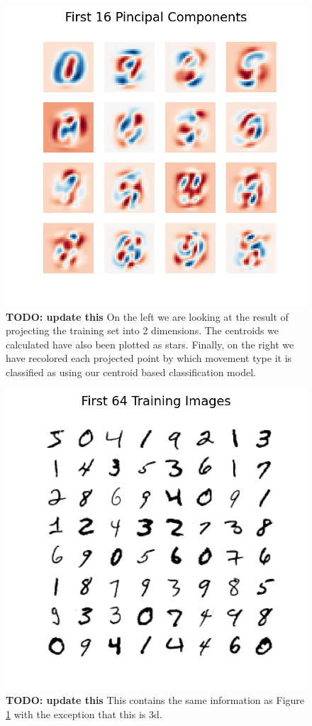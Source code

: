 \documentclass[11pt]{amsart}
\begin{document}
\begin{figure}[h]
	\centering
	\includegraphics[width=.75\textwidth]{../visualizations/first_16_pincipal_components.png}
 	\caption{ \textbf{TODO: update this} On the left we are looking at the result of projecting the training set into 2 dimensions.
	The centroids we calculated have also been plotted as stars.
	Finally, on the right we have recolored each projected point by which movement type it is classified as using our centroid based classification model.}\label{fig:f2}
\end{figure}

\begin{figure}[h]
	\centering
	\includegraphics[width=.75\textwidth]{../visualizations/first_64_training_images.png}
 	\caption{ \textbf{TODO: update this} This contains the same information as Figure \ref{fig:f2} with the exception that this is 3d.}\label{fig:f3}
\end{figure}
\end{document}
